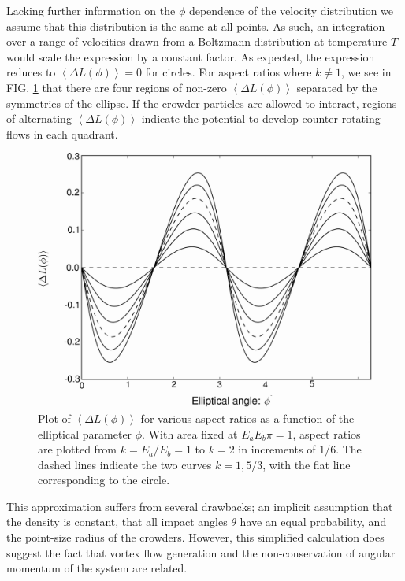 Lacking further information on the $\phi$ dependence of the velocity distribution we assume that this distribution is the same at all points. As such, an integration over a range of velocities drawn from a Boltzmann distribution at temperature $T$ would scale the expression by a constant factor. As expected, the expression reduces to $\left < \Delta L(\phi) \right >=0$ for circles. For aspect ratios where $k \neq 1$, we see in FIG. \ref{fig:delta_L} that there are four regions of non-zero $\left < \Delta L(\phi) \right >$ separated by the symmetries of the ellipse. If the crowder particles are allowed to interact, regions of alternating $\left < \Delta L(\phi) \right >$ indicate the potential to develop counter-rotating flows in each quadrant. 
%
\begin{figure}
\includegraphics[width=\figurewidthSINGLE]{entropic_flow_paper/FIG5_EDIT.jpg}
\caption{Plot of $\left < \Delta L(\phi) \right >$ for various aspect ratios as a function of the elliptical parameter $\phi$. With area fixed at $E_a E_b \pi=1$, aspect ratios are plotted from $k=E_a/E_b=1$ to $k=2$ in increments of $1/6$. The dashed lines indicate the two curves $k=1,5/3$, with the flat line corresponding to the circle. }
\label{fig:delta_L}
\end{figure}
%
This approximation suffers from several drawbacks; an implicit assumption that the density is constant, that all impact angles $\theta$ have an equal probability, and the point-size radius of the crowders. However, this simplified calculation does suggest the fact that  vortex flow generation and the non-conservation of angular momentum of the system are related.

